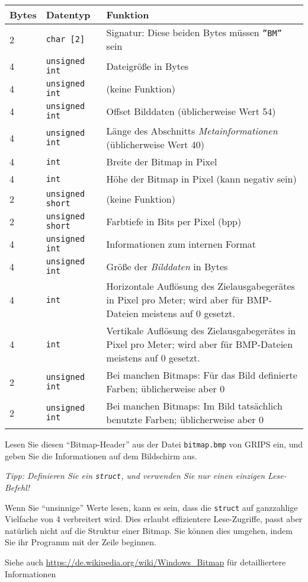 \documentclass[
	ngerman,
	fontsize=10pt,
	parskip=half,
	titlepage=true,
	DIV=12
]{scrartcl}
\begin{document}
\begin{tabular}{llp{10cm}}
	Bytes & Datentyp                       & Funktion \\ \hline
	2     & \texttt{char [2]}       & Signatur: Diese beiden Bytes müssen \texttt{''BM''} sein \\
	4     & \texttt{unsigned int}   & Dateigröße in Bytes\\
	4     & \texttt{unsigned int}   & (keine Funktion)\\
	4     & \texttt{unsigned int}   & Offset Bilddaten (üblicherweise Wert 54)\\
	
	4     & \texttt{unsigned int}   & Länge des Abschnitts \emph{Metainformationen} 
											(üblicherweise Wert 40)\\
    4     & \texttt{int}            & Breite der Bitmap in Pixel\\
    4     & \texttt{int}            & Höhe der Bitmap in Pixel (kann negativ sein)\\
	2     & \texttt{unsigned short} & (keine Funktion)\\
	2     & \texttt{unsigned short} & Farbtiefe in Bits per Pixel (bpp)\\
	4     & \texttt{unsigned int}   & Informationen zum internen Format\\
	4     & \texttt{unsigned int}   & Größe der \emph{Bilddaten} in Bytes\\
    4     & \texttt{int}            & Horizontale Auflösung des Zielausgabegerätes in Pixel pro
    											Meter; wird aber für BMP-Dateien meistens auf 0 gesetzt.\\
    4     & \texttt{int}            & Vertikale Auflösung des Zielausgabegerätes in Pixel pro
    											Meter; wird aber für BMP-Dateien meistens auf 0 gesetzt.\\
	2     & \texttt{unsigned int}   & Bei manchen Bitmaps: Für das Bild definierte Farben;
											üblicherweise aber 0\\
	2     & \texttt{unsigned int}   & Bei manchen Bitmaps: Im Bild tatsächlich benutzte Farben;
											üblicherweise aber 0\\
\end{tabular}

Lesen Sie diesen \enquote{Bitmap-Header} aus der Datei \texttt{bitmap.bmp} von GRIPS ein, und geben Sie die Informationen auf dem Bildschirm aus.

\emph{Tipp: Definieren Sie ein \texttt{struct}, und verwenden Sie nur einen einzigen Lese-Befehl!}

Wenn Sie \enquote{unsinnige} Werte lesen, kann es sein, dass die \texttt{struct} auf ganzzahlige Vielfache von 4 verbreitert wird. Dies erlaubt effizientere Lese-Zugriffe, passt aber natürlich nicht auf die Struktur einer Bitmap. Sie können dies umgehen, indem Sie ihr Programm mit der Zeile
beginnen.

Siehe auch \url{https://de.wikipedia.org/wiki/Windows_Bitmap} für detailliertere Informationen
\end{document}
